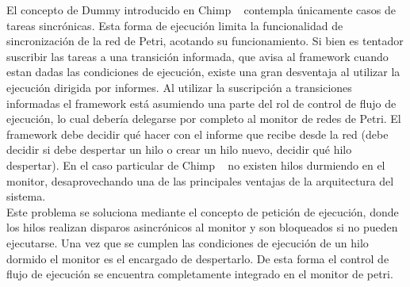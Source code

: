 El concepto de Dummy introducido en Chimp ~\cite{chimp} contempla únicamente
casos de tareas sincrónicas. Esta forma de ejecución limita la funcionalidad de
sincronización de la red de Petri, acotando su funcionamiento. Si bien es
tentador suscribir las tareas a una transición informada, que avisa al framework
cuando estan dadas las condiciones de ejecución, existe una gran desventaja al
utilizar la ejecución dirigida por informes. Al utilizar la suscripción a
transiciones informadas el framework está asumiendo una parte del rol de control
de flujo de ejecución, lo cual debería delegarse por completo al monitor de
redes de Petri. El framework debe decidir qué hacer con el informe que recibe
desde la red (debe decidir si debe despertar un hilo o crear un hilo nuevo,
decidir qué hilo despertar). En el caso particular de Chimp ~\cite{chimp} no
existen hilos durmiendo en el monitor, desaprovechando una de las principales
ventajas de la arquitectura del sistema.
\\
Este problema se soluciona mediante el concepto de petición de ejecución, donde
los hilos realizan disparos asincrónicos al monitor y son bloqueados si no
pueden ejecutarse. Una vez que se cumplen las condiciones de ejecución de un
hilo dormido el monitor es el encargado de despertarlo. De esta forma el control
de flujo de ejecución se encuentra completamente integrado en el monitor de
petri.

